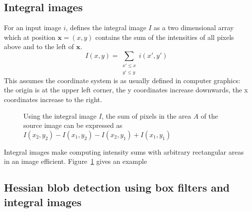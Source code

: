 \subsection{Integral images}

For an input image $i$, \cite{Viola01rapidobject} defines the integral image $I$ as a two dimensional array which at position $\mathbf{x} = (x,y)$ contains the sum of the intensities of all pixels above and to the left of $\mathbf{x}$.
\begin{equation}
I(x,y) = \sum_{\begin{smallmatrix} x' \le x \\ y' \le y\end{smallmatrix}} i(x',y')
\end{equation}
This assumes the coordinate system is as usually defined in computer graphics: the origin is at the upper left corner, the y coordinates increase downwards, the x coordinates increase to the right.

\begin{figure}
    \centering
    \caption{
        Using the integral image $I$, the sum of pixels in the area $A$ of the source image can be expressed as
        $I(x_2,y_2) -  I(x_1,y_2) - I(x_2,y_1) + I(x_1,y_1)$
        \label{fig:integral_images}
    }
\end{figure}

Integral images make computing intensity sums with arbitrary rectangular areas in an image efficient. Figure~\ref{fig:integral_images} gives an example

\subsection{Hessian blob detection using box filters and integral images}

